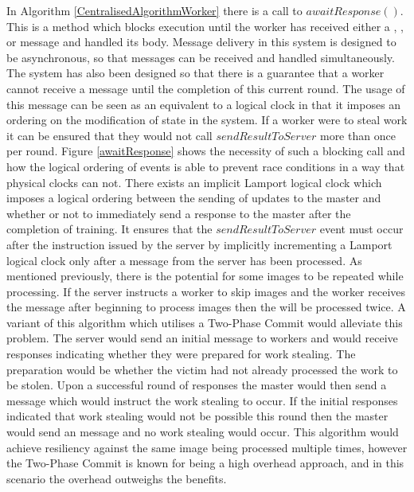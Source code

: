 \documentclass[12pt]{article}
\begin{document}
In Algorithm \ref{CentralisedAlgorithmWorker} there is a call to $awaitResponse()$. This is a method which blocks execution until the worker has received either a , , or  message and handled its body. Message delivery in this system is designed to be asynchronous, so that messages can be received and handled simultaneously. The system has also been designed so that there is a guarantee that a worker cannot receive a  message until the completion of this current round. The usage of this message can be seen as an equivalent to a logical clock in that it imposes an ordering on the modification of state in the system. If a worker were to steal work it can be ensured that they would not call $sendResultToServer$ more than once per round. Figure \ref{awaitResponse} shows the necessity of such a blocking call and how the logical ordering of events is able to prevent race conditions in a way that physical clocks can not.
\newline
\newline
There exists an implicit Lamport logical clock which imposes a logical ordering between the sending of updates to the master and whether or not to immediately send a response to the master after the completion of training. It ensures that the $sendResultToServer$ event must occur after the instruction issued by the server by implicitly incrementing a Lamport logical clock only after a message from the server has been processed.
\newline
\newline
As mentioned previously, there is the potential for some images to be repeated while processing. If the server instructs a worker to skip images and the worker receives the message after beginning to process images then the will be processed twice. A variant of this algorithm which utilises a Two-Phase Commit would alleviate this problem. The server would send an initial  message to workers and would receive responses indicating whether they were prepared for work stealing. The preparation would be whether the victim had not already processed the work to be stolen. Upon a successful round of responses the master would then send a  message which would instruct the work stealing to occur. If the initial responses indicated that work stealing would not be possible this round then the master would send an  message and no work stealing would occur.
\newline
\newline
This algorithm would achieve resiliency against the same image being processed multiple times, however the Two-Phase Commit is known for being a high overhead approach, and in this scenario the overhead outweighs the benefits.
\end{document}
